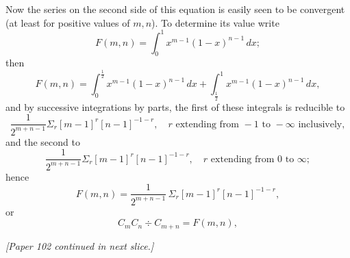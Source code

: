 \documentclass[11pt]{article}
\begin{document}
Now the series on the second side of this equation is easily seen to be convergent (at least for positive values of $m,n$). To determine its value write
\[ F(m,n) = \int_0^1 x^{m-1}(1-x)^{n-1}\, dx; \]
then
\[ F(m,n) = \int_0^{\tfrac{1}{2}} x^{m-1}(1-x)^{n-1}\, dx + \int_{\tfrac{1}{2}}^1 x^{m-1}(1-x)^{n-1}\, dx, \]
and by successive integrations by parts, the first of these integrals is reducible to
\[ \frac{1}{2^{m+n-1}}\Sigma_r [m-1]^r [n-1]^{-1-r}, \quad r \text{ extending from } -1 \text{ to } -\infty \text{ inclusively}, \]
and the second to
\[ \frac{1}{2^{m+n-1}}\Sigma_r [m-1]^r [n-1]^{-1-r}, \quad r \text{ extending from } 0 \text{ to } \infty; \]
hence
\[ F(m,n) = \frac{1}{2^{m+n-1}}\,\Sigma_r [m-1]^r [n-1]^{-1-r}, \]
or
\begin{equation}
C_m C_n \div C_{m+n} = F(m,n),
\end{equation}

\bigskip
\noindent\emph{[Paper 102 continued in next slice.]}
\end{document}

